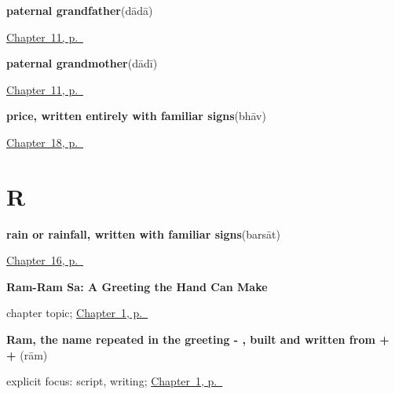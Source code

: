 \noindent\begin{minipage}[t]{\linewidth}
\raggedright
\textbf{paternal grandfather}\enspace\emph{}\enspace(dādā)\par
\footnotesize \hyperref[ch:mw-family-seven]{Chapter~11, p.~\pageref*{ch:mw-family-seven}}
\end{minipage}\par\smallskip

\noindent\begin{minipage}[t]{\linewidth}
\raggedright
\textbf{paternal grandmother}\enspace\emph{}\enspace(dādī)\par
\footnotesize \hyperref[ch:mw-family-seven]{Chapter~11, p.~\pageref*{ch:mw-family-seven}}
\end{minipage}\par\smallskip

\noindent\begin{minipage}[t]{\linewidth}
\raggedright
\textbf{price, written entirely with familiar signs}\enspace\emph{}\enspace(bhāv)\par
\footnotesize \hyperref[ch:mw-shopping-three]{Chapter~18, p.~\pageref*{ch:mw-shopping-three}}
\end{minipage}\par\smallskip

\section*{R}

\noindent\begin{minipage}[t]{\linewidth}
\raggedright
\textbf{rain or rainfall, written with familiar signs}\enspace\emph{}\enspace(barsāt)\par
\footnotesize \hyperref[ch:mw-weather-three]{Chapter~16, p.~\pageref*{ch:mw-weather-three}}
\end{minipage}\par\smallskip

\noindent\begin{minipage}[t]{\linewidth}
\raggedright
\textbf{Ram-Ram Sa: A Greeting the Hand Can Make}\par
\footnotesize chapter topic; \hyperref[ch:mw-ram-ram-sa]{Chapter~1, p.~\pageref*{ch:mw-ram-ram-sa}}
\end{minipage}\par\smallskip

\noindent\begin{minipage}[t]{\linewidth}
\raggedright
\textbf{Ram, the name repeated in the greeting - , built and written from  +  + }\enspace\emph{}\enspace(rām)\par
\footnotesize explicit focus: script, writing; \hyperref[ch:mw-ram-ram-sa]{Chapter~1, p.~\pageref*{ch:mw-ram-ram-sa}}
\end{minipage}\par\smallskip

